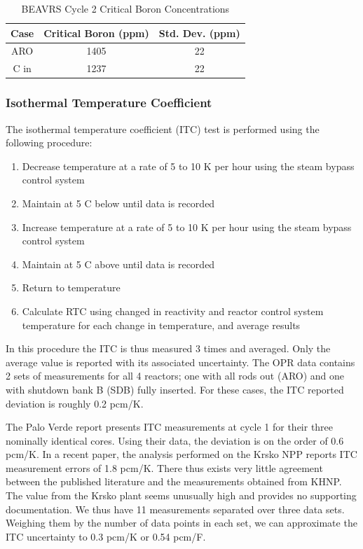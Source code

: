 \documentclass{article}
\begin{document}
\begin{table}[ht]
\centering
\caption{BEAVRS Cycle 2 Critical Boron Concentrations}
\begin{tabular}{ |c|c|c| } 
 \hline
 Case & Critical Boron (ppm) & Std. Dev. (ppm) \\  
 \hline
 ARO & 1405 & 22 \\ 
 C in & 1237 & 22  \\
 \hline
 \end{tabular}
\label{tab:cyc2_boron_conc}
\end{table}

\subsubsection{Isothermal Temperature Coefficient}

The isothermal temperature coefficient (ITC) test is performed using the following procedure:
\begin{enumerate}
\item Decrease temperature at a rate of 5 to 10 K per hour using the steam bypass control system
\item Maintain at 5 C below until data is recorded
\item Increase temperature at a rate of 5 to 10 K per hour using the steam bypass control system
\item Maintain at 5 C above until data is recorded
\item Return to temperature
\item Calculate RTC using changed in reactivity and reactor control system temperature for each change in temperature, and average results
\end{enumerate}

In this procedure the ITC is thus measured 3 times and averaged.  Only the average value is reported with its associated uncertainty.  The OPR data contains 2 sets of measurements for all 4 reactors; one with all rods out (ARO) and one with shutdown bank B (SDB) fully inserted. For these cases, the ITC reported deviation is roughly 0.2 pcm/K.

The Palo Verde report \cite{paloverde} presents ITC measurements at cycle 1 for their three nominally identical cores.  Using their data, the deviation is on the order of 0.6 pcm/K. In a recent paper, the analysis performed on the Krsko NPP reports ITC measurement errors of 1.8 pcm/K.  There thus exists very little agreement between the published literature and the measurements obtained from KHNP.  The value from the Krsko plant seems unusually high and provides no supporting documentation.  We thus have 11 measurements separated over three data sets.  Weighing them by the number of data points in each set, we can approximate the ITC uncertainty to 0.3 pcm/K or 0.54 pcm/F.
\end{document}
